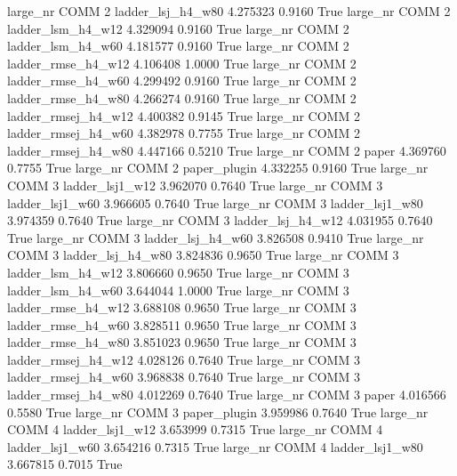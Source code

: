   large_nr     COMM                 2   ladder_lsj_h4_w80   4.275323      0.9160    True
  large_nr     COMM                 2   ladder_lsm_h4_w12   4.329094      0.9160    True
  large_nr     COMM                 2   ladder_lsm_h4_w60   4.181577      0.9160    True
  large_nr     COMM                 2  ladder_rmse_h4_w12   4.106408      1.0000    True
  large_nr     COMM                 2  ladder_rmse_h4_w60   4.299492      0.9160    True
  large_nr     COMM                 2  ladder_rmse_h4_w80   4.266274      0.9160    True
  large_nr     COMM                 2 ladder_rmsej_h4_w12   4.400382      0.9145    True
  large_nr     COMM                 2 ladder_rmsej_h4_w60   4.382978      0.7755    True
  large_nr     COMM                 2 ladder_rmsej_h4_w80   4.447166      0.5210    True
  large_nr     COMM                 2               paper   4.369760      0.7755    True
  large_nr     COMM                 2        paper_plugin   4.332255      0.9160    True
  large_nr     COMM                 3     ladder_lsj1_w12   3.962070      0.7640    True
  large_nr     COMM                 3     ladder_lsj1_w60   3.966605      0.7640    True
  large_nr     COMM                 3     ladder_lsj1_w80   3.974359      0.7640    True
  large_nr     COMM                 3   ladder_lsj_h4_w12   4.031955      0.7640    True
  large_nr     COMM                 3   ladder_lsj_h4_w60   3.826508      0.9410    True
  large_nr     COMM                 3   ladder_lsj_h4_w80   3.824836      0.9650    True
  large_nr     COMM                 3   ladder_lsm_h4_w12   3.806660      0.9650    True
  large_nr     COMM                 3   ladder_lsm_h4_w60   3.644044      1.0000    True
  large_nr     COMM                 3  ladder_rmse_h4_w12   3.688108      0.9650    True
  large_nr     COMM                 3  ladder_rmse_h4_w60   3.828511      0.9650    True
  large_nr     COMM                 3  ladder_rmse_h4_w80   3.851023      0.9650    True
  large_nr     COMM                 3 ladder_rmsej_h4_w12   4.028126      0.7640    True
  large_nr     COMM                 3 ladder_rmsej_h4_w60   3.968838      0.7640    True
  large_nr     COMM                 3 ladder_rmsej_h4_w80   4.012269      0.7640    True
  large_nr     COMM                 3               paper   4.016566      0.5580    True
  large_nr     COMM                 3        paper_plugin   3.959986      0.7640    True
  large_nr     COMM                 4     ladder_lsj1_w12   3.653999      0.7315    True
  large_nr     COMM                 4     ladder_lsj1_w60   3.654216      0.7315    True
  large_nr     COMM                 4     ladder_lsj1_w80   3.667815      0.7015    True
